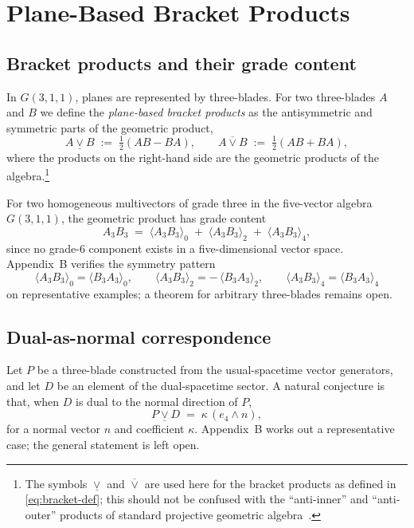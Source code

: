 \documentclass[dvipdfmx,a4paper]{article}
\theoremstyle{definition}
\theoremstyle{plain}
\theoremstyle{remark}
\begin{document}
\section{Plane-Based Bracket Products}
\label{sec:brackets-open}

\subsection{Bracket products and their grade content}

In \(G(3,1,1)\), planes are represented by three-blades. For two three-blades \(A\) and \(B\) we define the \emph{plane-based bracket products} as the antisymmetric and symmetric parts of the geometric product,
\begin{equation}
A \mathbin{\underline{\vee}} B \;:=\; \tfrac{1}{2}(AB - BA),
\qquad
A \mathbin{\overline{\vee}} B \;:=\; \tfrac{1}{2}(AB + BA),
\label{eq:bracket-def}
\end{equation}
where the products on the right-hand side are the geometric products of the algebra.\footnote{The symbols \(\underline{\vee}\) and \(\overline{\vee}\) are used here for the bracket products as defined in \eqref{eq:bracket-def}; this should not be confused with the ``anti-inner'' and ``anti-outer'' products of standard projective geometric algebra~\cite{Lengyel2024,DorstFontijneMann2007}.}

For two homogeneous multivectors of grade three in the five-vector algebra \(G(3,1,1)\), the geometric product has grade content
\[
A_{3}B_{3} \;=\; \langle A_{3}B_{3}\rangle_{0} \;+\; \langle A_{3}B_{3}\rangle_{2} \;+\; \langle A_{3}B_{3}\rangle_{4},
\]
since no grade-6 component exists in a five-dimensional vector space. Appendix~B verifies the symmetry pattern
\[
\langle A_{3}B_{3}\rangle_{0} = \langle B_{3}A_{3}\rangle_{0},
\qquad
\langle A_{3}B_{3}\rangle_{2} = -\,\langle B_{3}A_{3}\rangle_{2},
\qquad
\langle A_{3}B_{3}\rangle_{4} = \langle B_{3}A_{3}\rangle_{4}
\]
on representative examples; a theorem for arbitrary three-blades remains open.

\subsection{Dual-as-normal correspondence}

Let \(P\) be a three-blade constructed from the usual-spacetime vector generators, and let \(D\) be an element of the dual-spacetime sector. A natural conjecture is that, when \(D\) is dual to the normal direction of \(P\),
\begin{equation}
P \mathbin{\underline{\vee}} D \;=\; \kappa \, (e_{4}\wedge n),
\label{eq:normal-correspondence}
\end{equation}
for a normal vector \(n\) and coefficient \(\kappa\). Appendix~B works out a representative case; the general statement is left open.
\end{document}
